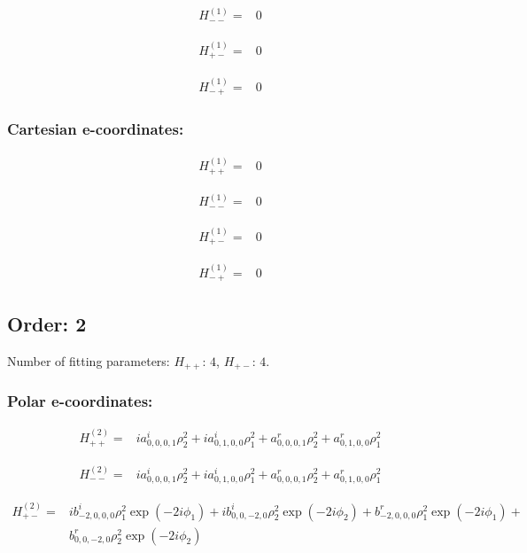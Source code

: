 \documentclass[fleqn]{article}
\begin{document}
\begin{align*}
H_{--}^{(1)}=&0
\end{align*}

\begin{align*}
H_{+-}^{(1)}=&0
\end{align*}

\begin{align*}
H_{-+}^{(1)}=&0
\end{align*}
\subsubsection*{Cartesian e-coordinates:}

\begin{align*}
H_{++}^{(1)}=&0
\end{align*}

\begin{align*}
H_{--}^{(1)}=&0
\end{align*}

\begin{align*}
H_{+-}^{(1)}=&0
\end{align*}

\begin{align*}
H_{-+}^{(1)}=&0
\end{align*}
\subsection{Order: 2}
Number of fitting parameters: $H_{++}$: $4$, $H_{+-}$: $4$.
\subsubsection*{Polar e-coordinates:}

\begin{align*}
H_{++}^{(2)}=&i a^{i}_{0,0,0,1} \rho_{2}^{2} + i a^{i}_{0,1,0,0} \rho_{1}^{2} + a^{r}_{0,0,0,1} \rho_{2}^{2} + a^{r}_{0,1,0,0} \rho_{1}^{2}
\end{align*}

\begin{align*}
H_{--}^{(2)}=&i a^{i}_{0,0,0,1} \rho_{2}^{2} + i a^{i}_{0,1,0,0} \rho_{1}^{2} + a^{r}_{0,0,0,1} \rho_{2}^{2} + a^{r}_{0,1,0,0} \rho_{1}^{2}
\end{align*}

\begin{align*}
H_{+-}^{(2)}=&i b^{i}_{-2,0,0,0} \rho_{1}^{2} \exp (- 2 i \phi_{1}) + i b^{i}_{0,0,-2,0} \rho_{2}^{2} \exp (- 2 i \phi_{2}) + b^{r}_{-2,0,0,0} \rho_{1}^{2} \exp (- 2 i \phi_{1}) +\\
& b^{r}_{0,0,-2,0} \rho_{2}^{2} \exp (- 2 i \phi_{2})
\end{align*}
\end{document}
